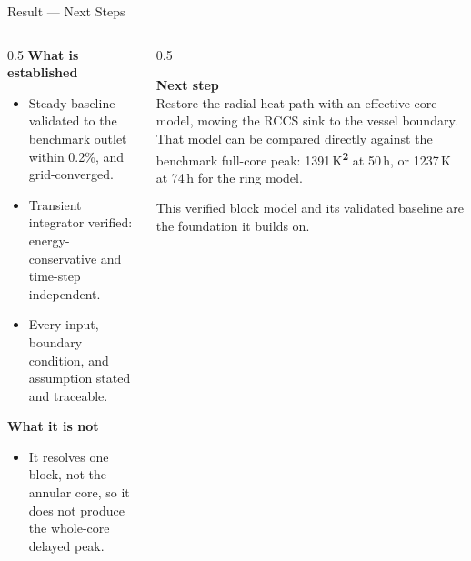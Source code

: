 \documentclass[aspectratio=169, 11pt, t]{beamer}
\newcommand{\ct}[1]{\textsuperscript{\normalfont\color{midGray}\bfseries #1}}
\begin{document}
\begin{frame}{Result --- Next Steps}
\begin{columns}[T]
\begin{column}{0.5\textwidth}
{\color{RadNavy}\bfseries What is established}
\begin{itemize}\setlength\itemsep{6pt}\small
  \item Steady baseline validated to the benchmark outlet within 0.2\%, and grid-converged.
  \item Transient integrator verified: energy-conservative and time-step independent.
  \item Every input, boundary condition, and assumption stated and traceable.
\end{itemize}
\vspace{9pt}
{\color{RadNavy}\bfseries What it is not}
\begin{itemize}\setlength\itemsep{5pt}\small
  \item It resolves one block, not the annular core, so it does not produce the whole-core delayed peak.
\end{itemize}
\end{column}
\begin{column}{0.5\textwidth}
\vspace{6pt}
\begin{tcolorbox}[bluebox]
{\color{RadBlue}\bfseries Next step}\\[2pt]
\footnotesize Restore the radial heat path with an effective-core model, moving the RCCS sink to the vessel boundary. That model can be compared directly against the benchmark full-core peak: 1391\,K\ct{2} at 50\,h, or 1237\,K at 74\,h for the ring model.
\end{tcolorbox}
\vspace{7pt}
{\color{midGray}\footnotesize This verified block model and its validated baseline are the foundation it builds on.}
\end{column}
\end{columns}
\end{frame}
\end{document}
